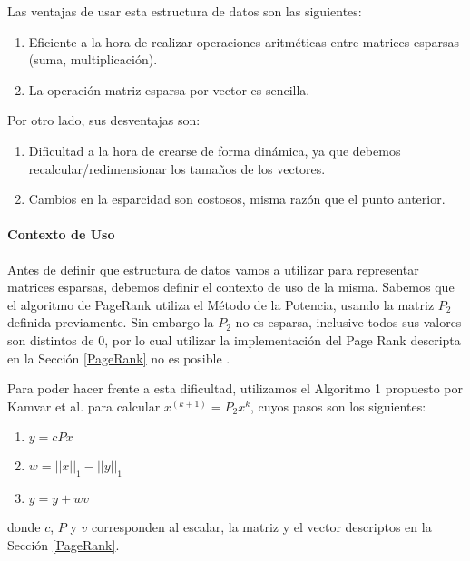 Las ventajas de usar esta estructura de datos son las siguientes:
\begin{enumerate}
  \item Eficiente a la hora de realizar operaciones aritméticas entre matrices esparsas (suma, multiplicación).
  \item La operación matriz esparsa por vector es sencilla.
\end{enumerate}
Por otro lado, sus desventajas son:
\begin{enumerate}
  \item Dificultad a la hora de crearse de forma dinámica, ya que debemos recalcular/redimensionar los tamaños de los vectores.
  \item Cambios en la esparcidad son costosos, misma razón que el punto anterior.
\end{enumerate}

\paragraph{Contexto de Uso}

Antes de definir que estructura de datos vamos a utilizar para representar matrices esparsas, debemos definir el contexto de uso de la misma.
Sabemos que el algoritmo de PageRank utiliza el Método de la Potencia, usando la matriz $P_2$ definida previamente. Sin embargo la $P_2$ no es esparsa, inclusive todos sus valores son distintos de 0, por lo cual utilizar la implementación del Page Rank descripta en la Sección \ref{PageRank} no es posible .

Para poder hacer frente a esta dificultad, utilizamos el Algoritmo 1 propuesto por Kamvar et al.\cite{Kamvar2003} para calcular $x^{(k+1)} = P_2x^{k}$, cuyos pasos son los siguientes:
\begin{enumerate}
    \item $y = cPx$
    \item $w = ||x||_1 - ||y||_1$
    \item $y = y + wv$
\end{enumerate}

donde $c$, $P$ y $v$ corresponden al escalar, la matriz y el vector descriptos en la Sección \ref{PageRank}.

